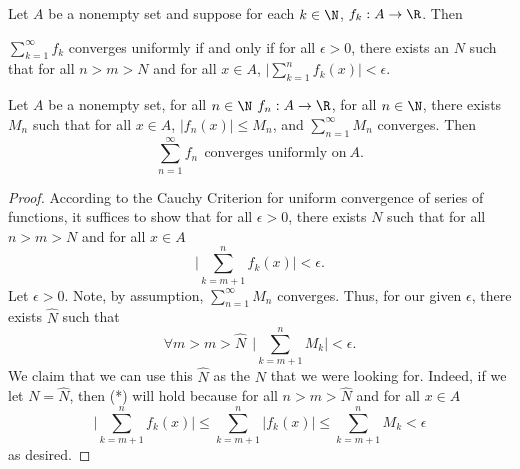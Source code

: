 \begin{theorem}\label{Cauchy Criterion for Uniform Convergence of Series of Functions}
    Let \( A  \) be a nonempty set and suppose for each \( k \in \N  \), \( {f}_{k } : A \to \R  \). Then
    \begin{center}
        \( \displaystyle \sum_{ k=1  }^{ \infty  } {f}_{k } \) converges uniformly if and only if for all \(  \epsilon > 0  \), there exists an \( N  \) such that for all \( n > m > N  \) and for all \( x \in A  \), \( \displaystyle \Big| \sum_{ k=1  }^{ n } {f}_{k } (x) \Big| < \epsilon \).
    \end{center}
\end{theorem}

\begin{theorem}\label{Weierstrass M-Test}
    Let \( A  \) be a nonempty set, for all \( n \in \N  \) \( {f}_{n} : A \to \R  \), for all \(  n \in \N  \), there exists \( {M}_{n} \) such that for all \( x \in A  \), \( | {f}_{n}(x) |  \leq {M}_{n} \), and \( \displaystyle \sum_{ n=1  }^{ \infty  } {M}_{n}  \) converges. Then 
    \[  \sum_{ n=1  }^{ \infty  } {f}_{n} \ \ \text{converges uniformly on} \ A.  \]
\end{theorem}
\begin{proof}
    According to the Cauchy Criterion for uniform convergence of series of functions, it suffices to show that for all \( \epsilon > 0  \), there exists \( N  \) such that for all \( n > m > N  \)  and for all \( x \in A  \)
    \[  \Big| \sum_{ k=m+1  }^{ n  } {f}_{k } (x) \Big|  < \epsilon. \tag{*} \]
    Let \( \epsilon > 0 \).
    Note, by assumption, \( \displaystyle \sum_{ n=1  }^{ \infty  } {M}_{n} \) converges. Thus, for our given \( \epsilon  \), there exists \( \hat{N} \) such that 
    \[  \forall m > m > \hat{N} \ \ \Big| \sum_{ k = m + 1  }^{ n } {M}_{k }  \Big|  < \epsilon. \]
    We claim that we can use this \( \hat{N} \) as the \( N  \) that we were looking for. Indeed, if we let \( N = \hat{N} \), then (*) will hold because for all \( n > m > \hat{N} \) and for all \( x \in A  \)
    \[ \Big| \sum_{ k= m+1 }^{  n  } {f}_{k }(x) \Big|  \leq \sum_{ k = m + 1  }^{ n } | {f}_{k }(x) | \leq \sum_{ k= m + 1  }^{ n } {M}_{k } < \epsilon  \]
    as desired.
\end{proof}





